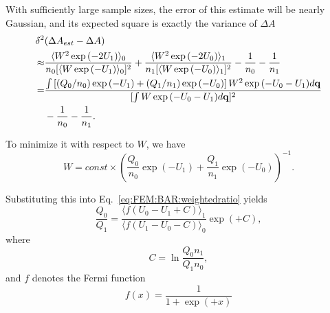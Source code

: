 With sufficiently large sample sizes, the error of this estimate will
be nearly Gaussian, and its expected square is exactly the variance
of $\Delta A$ 
\begin{align}
	\delta^2 & (\Delta A_{est}-\Delta A)\nonumber \\
	\approx & \frac{\langle W^{2}\exp{(-2U_{1})}\rangle_{0}}{n_{0}[\langle W\exp{(-U_{1})}\rangle_{0}]^{2}}+\frac{\langle W^{2}\exp{(-2U_{0})}\rangle_{1}}{n_{1}[\langle W\exp{(-U_{0})}\rangle_{1}]^{2}}-\frac{1}{n_{0}}-\frac{1}{n_{1}}\nonumber \\
	= & \frac{\int\left[(Q_{0}/n_{0})\exp{(-U_{1})}+(Q_{1}/n_{1})\exp{(-U_{0})}\right]W^{2}\exp{(-U_{0}-U_{1})}d\mathbf{{q}}}{[\int W\exp{(-U_{0}-U_{1})}d\mathbf{{q}}]^{2}}\notag\\
	  &-\frac{1}{n_{0}}-\frac{1}{n_{1}}.\label{eq:FEM:BAR:expectation}
\end{align}

To minimize it with respect to $W$, we have
\begin{equation}
	W=const\times\left(\frac{Q_{0}}{n_{0}}\exp{(-U_{1})}+\frac{Q_{1}}{n_{1}}\exp{(-U_{0})}\right)^{-1}.
\end{equation}

Substituting this into Eq.~\ref{eq:FEM:BAR:weightedratio} yields
\begin{equation}
	\frac{Q_{0}}{Q_{1}}=\frac{\langle f(U_{0}-U_{1}+C)\rangle_{1}}{\langle f(U_{1}-U_{0}-C)\rangle_{0}}\exp{(+C)},
	\label{Eq:FEM:BAR:BAR}
\end{equation}
where
\begin{equation}
	C=\ln\frac{Q_{0}n_{1}}{Q_{1}n_{0}},
\end{equation}
and $f$ denotes the Fermi function
\begin{equation}
	f(x)=\frac{1}{1+\exp{(+x)}}
\end{equation}